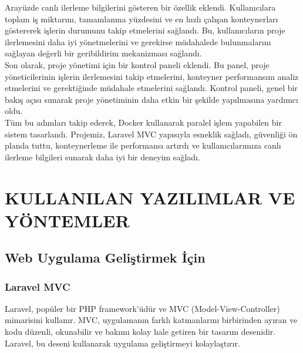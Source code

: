 Arayüzde canlı ilerleme bilgilerini gösteren bir özellik eklendi. Kullanıcılara toplam iş miktarını, tamamlanma yüzdesini ve en hızlı çalışan konteynerları göstererek işlerin durumunu takip etmelerini sağlandı. Bu, kullanıcıların proje ilerlemesini daha iyi yönetmelerini ve gerekirse müdahalede bulunmalarını sağlayan değerli bir geribildirim mekanizması sağlandı.\\
Son olarak, proje yönetimi için bir kontrol paneli eklendi. Bu panel, proje yöneticilerinin işlerin ilerlemesini takip etmelerini, konteyner performansını analiz etmelerini ve gerektiğinde müdahale etmelerini sağlandı. Kontrol paneli, genel bir bakış açısı sunarak proje yönetiminin daha etkin bir şekilde yapılmasına yardımcı oldu.\\
Tüm bu adımları takip ederek, Docker kullanarak paralel işlem yapabilen bir sistem tasarlandı. Projemiz, Laravel MVC yapısıyla esneklik sağladı, güvenliği ön planda tuttu, konteynerleme ile performansı artırdı ve kullanıcılarımıza canlı ilerleme bilgileri sunarak daha iyi bir deneyim sağladı.\\


\section{KULLANILAN YAZILIMLAR VE YÖNTEMLER}

\subsection{Web Uygulama Geliştirmek İçin}
\subsubsection{Laravel MVC}
Laravel, popüler bir PHP framework'üdür ve MVC (Model-View-Controller) mimarisini kullanır. MVC, uygulamanın farklı katmanlarını birbirinden ayıran ve kodu düzenli, okunabilir ve bakımı kolay hale getiren bir tasarım desenidir. Laravel, bu deseni kullanarak uygulama geliştirmeyi kolaylaştırır.

